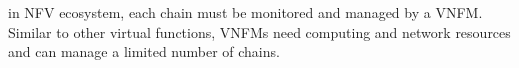 in NFV ecosystem, each chain must be monitored and managed by a VNFM. Similar to other virtual functions, VNFMs need computing and network resources and  can manage a limited number of chains.
